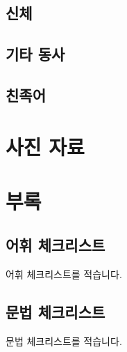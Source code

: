 \documentclass{snu-fl-questionnaire}
\begin{document}
\section{신체}
\section{기타 동사}

\section{친족어}

\chapter{사진 자료}
\ImagRefs

\chapter*{부록}
\begin{appendices}

\section{어휘 체크리스트}
어휘 체크리스트를 적습니다.

\section{문법 체크리스트}
문법 체크리스트를 적습니다.

\end{appendices}


\backmatter
\makebackcover
\end{document}
